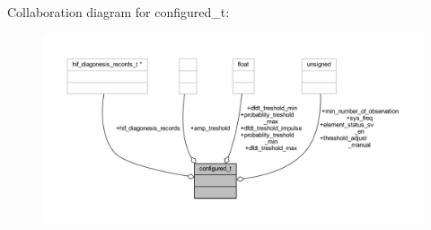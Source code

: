 Collaboration diagram for configured\+\_\+t\+:\nopagebreak
\begin{figure}[H]
\begin{center}
\leavevmode
\includegraphics[width=350pt]{d5/d69/a00878}
\end{center}
\end{figure}
